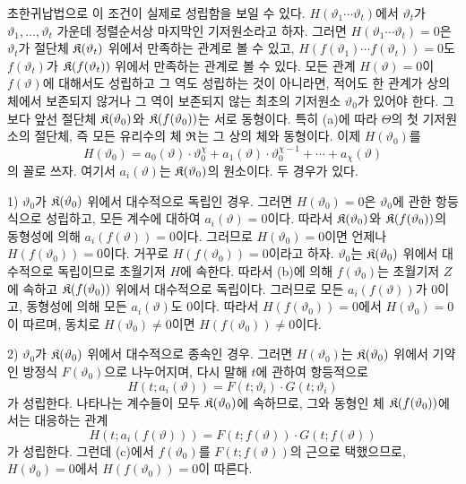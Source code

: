 초한귀납법으로 이 조건이 실제로 성립함을 보일 수 있다. \(H(\vartheta_1\cdots\vartheta_t)\)에서 \(\vartheta_t\)가 \(\vartheta_1,\ldots,\vartheta_t\) 가운데 정렬순서상 마지막인 기저원소라고 하자. 그러면 \(H(\vartheta_1\cdots\vartheta_t)=0\)은 \(\vartheta_t\)가 절단체 \(\mathfrak K(\vartheta_t)\) 위에서 만족하는 관계로 볼 수 있고, \(H(f(\vartheta_1)\cdots f(\vartheta_t))=0\)도 \(f(\vartheta_t)\)가 \(\mathfrak K(f(\vartheta_t))\) 위에서 만족하는 관계로 볼 수 있다. 모든 관계 \(H(\vartheta)=0\)이 \(f(\vartheta)\)에 대해서도 성립하고 그 역도 성립하는 것이 아니라면, 적어도 한 관계가 상의 체에서 보존되지 않거나 그 역이 보존되지 않는 최초의 기저원소 \(\vartheta_0\)가 있어야 한다. 그보다 앞선 절단체 \(\mathfrak K(\vartheta_0)\)와 \(\mathfrak K(f(\vartheta_0))\)는 서로 동형이다. 특히 (a)에 따라 \(\Theta\)의 첫 기저원소의 절단체, 즉 모든 유리수의 체 \(\mathfrak R\)는 그 상의 체와 동형이다. 이제 \(H(\vartheta_0)\)를
\[
H(\vartheta_0)=a_0(\vartheta)\cdot\vartheta_0^\chi
+a_1(\vartheta)\cdot\vartheta_0^{\chi-1}+\cdots+a_\chi(\vartheta)
\]
의 꼴로 쓰자. 여기서 \(a_i(\vartheta)\)는 \(\mathfrak K(\vartheta_0)\)의 원소이다. 두 경우가 있다.

1) \(\vartheta_0\)가 \(\mathfrak K(\vartheta_0)\) 위에서 대수적으로 독립인 경우. 그러면 \(H(\vartheta_0)=0\)은 \(\vartheta_0\)에 관한 항등식으로 성립하고, 모든 계수에 대하여 \(a_i(\vartheta)=0\)이다. 따라서 \(\mathfrak K(\vartheta_0)\)와 \(\mathfrak K(f(\vartheta_0))\)의 동형성에 의해 \(a_i(f(\vartheta))=0\)이다. 그러므로 \(H(\vartheta_0)=0\)이면 언제나 \(H(f(\vartheta_0))=0\)이다. 거꾸로 \(H(f(\vartheta_0))=0\)이라고 하자. \(\vartheta_0\)는 \(\mathfrak K(\vartheta_0)\) 위에서 대수적으로 독립이므로 초월기저 \(H\)에 속한다. 따라서 (b)에 의해 \(f(\vartheta_0)\)는 초월기저 \(Z\)에 속하고 \(\mathfrak K(f(\vartheta_0))\) 위에서 대수적으로 독립이다. 그러므로 모든 \(a_i(f(\vartheta))\)가 0이고, 동형성에 의해 모든 \(a_i(\vartheta)\)도 0이다. 따라서 \(H(f(\vartheta_0))=0\)에서 \(H(\vartheta_0)=0\)이 따르며, 동치로 \(H(\vartheta_0)\ne0\)이면 \(H(f(\vartheta_0))\ne0\)이다.

2) \(\vartheta_0\)가 \(\mathfrak K(\vartheta_0)\) 위에서 대수적으로 종속인 경우. 그러면 \(H(\vartheta_0)\)는 \(\mathfrak K(\vartheta_0)\) 위에서 기약인 방정식 \(F(\vartheta_0)\)으로 나누어지며, 다시 말해 \(t\)에 관하여 항등적으로
\[
H(t;a_i(\vartheta))=F(t;\vartheta_i)\cdot G(t;\vartheta_i)
\]
가 성립한다. 나타나는 계수들이 모두 \(\mathfrak K(\vartheta_0)\)에 속하므로, 그와 동형인 체 \(\mathfrak K(f(\vartheta_0))\)에서는 대응하는 관계
\[
H(t;a_i(f(\vartheta)))=F(t;f(\vartheta))\cdot G(t;f(\vartheta))
\]
가 성립한다. 그런데 (c)에서 \(f(\vartheta_0)\)를 \(F(t;f(\vartheta))\)의 근으로 택했으므로, \(H(\vartheta_0)=0\)에서 \(H(f(\vartheta_0))=0\)이 따른다.

